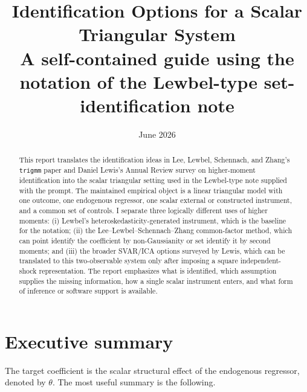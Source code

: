 \documentclass[11pt]{article}
\title{Identification Options for a Scalar Triangular System\\
\large A self-contained guide using the notation of the Lewbel-type set-identification note}
\author{}
\date{June 2026}
\theoremstyle{plain}
\theoremstyle{definition}
\theoremstyle{remark}
\begin{document}
\maketitle

\begin{abstract}
This report translates the identification ideas in Lee, Lewbel, Schennach, and
Zhang's \texttt{trigmm} paper and Daniel Lewis's Annual Review survey on
higher-moment identification into the scalar triangular setting used in the
Lewbel-type note supplied with the prompt. The maintained empirical object is a
linear triangular model with one outcome, one endogenous regressor, one scalar
external or constructed instrument, and a common set of controls. I separate
three logically different uses of higher moments: (i) Lewbel's
heteroskedasticity-generated instrument, which is the baseline for the notation;
(ii) the Lee--Lewbel--Schennach--Zhang common-factor method, which can point
identify the coefficient by non-Gaussianity or set identify it by second
moments; and (iii) the broader SVAR/ICA options surveyed by Lewis, which can be
translated to this two-observable system only after imposing a square
independent-shock representation. The report emphasizes what is identified,
which assumption supplies the missing information, how a single scalar
instrument enters, and what form of inference or software support is available.
\end{abstract}

\tableofcontents

\section{Executive summary}
\label{sec:exec}

The target coefficient is the scalar structural effect of the endogenous
regressor, denoted by $\theta$. The most useful summary is the following.
\end{document}
